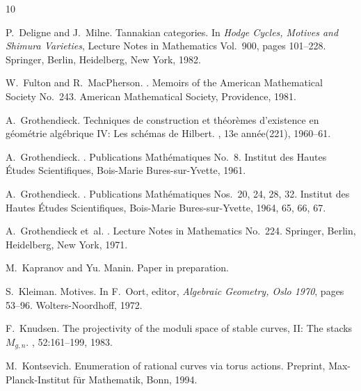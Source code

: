 \documentclass[11pt]{amsart}
\theoremstyle{definition}
\theoremstyle{remark}
\theoremstyle{plain}
\theoremstyle{definition}
\theoremstyle{remark}
\begin{document}
\begin{thebibliography}{10}

P.~Deligne and J.~Milne.
\newblock Tannakian categories.
\newblock In {\em Hodge Cycles, Motives and Shimura Varieties}, Lecture Notes
  in Mathematics Vol.\ 900, pages 101--228. Springer, Berlin, Heidelberg, New
  York, 1982.

W.~Fulton and R.~MacPherson.
.
\newblock Memoirs of the American Mathematical Society No.\ 243. American
  Mathematical Society, Providence, 1981.

A.~Grothendieck.
\newblock Techniques de construction et th\'eor\`emes d'existence en
  g\'eom\'etrie alg\'ebrique {IV}: Les sch\'emas de {H}ilbert.
, 13e ann\'ee(221), 1960--61.

A.~Grothendieck.
.
\newblock Publications Math\'ematiques No.\ 8. Institut des Hautes \'Etudes
  Scientifiques, Bois-Marie Bures-sur-Yvette, 1961.

A.~Grothendieck.
.
\newblock Publications Math\'ematiques Nos.\ 20, 24, 28, 32. Institut des
  Hautes \'Etudes Scientifiques, Bois-Marie Bures-sur-Yvette, 1964, 65, 66, 67.

A.~Grothendieck et~al.
.
\newblock Lecture Notes in Mathematics No.\ 224. Springer, Berlin, Heidelberg,
  New York, 1971.

M.~Kapranov and Yu. Manin.
\newblock Paper in preparation.

S.~Kleiman.
\newblock Motives.
\newblock In F.~Oort, editor, {\em Algebraic Geometry, Oslo 1970}, pages
  53--96. Wolters-Noordhoff, 1972.

F.~Knudsen.
\newblock The projectivity of the moduli space of stable curves, {I}{I}: The
  stacks \({M}_{g,n}\).
, 52:161--199, 1983.

M.~Kontsevich.
\newblock Enumeration of rational curves via torus actions.
\newblock Preprint, Max-Planck-Institut f\"ur Mathematik, Bonn, 1994.


\end{thebibliography}
\end{document}
